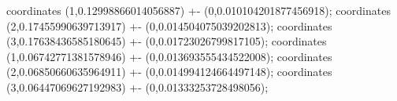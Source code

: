 coordinates {(1,0.12998866014056887) +- (0,0.010104201877456918)};
coordinates {(2,0.17455990639713917) +- (0,0.014504075039202813)};
coordinates {(3,0.17638436585180645) +- (0,0.01723026799817105)};
coordinates {(1,0.06742771381578946) +- (0,0.013693555434522008)};
coordinates {(2,0.06850660635964911) +- (0,0.014994124664497148)};
coordinates {(3,0.06447069627192983) +- (0,0.01333253728498056)};
